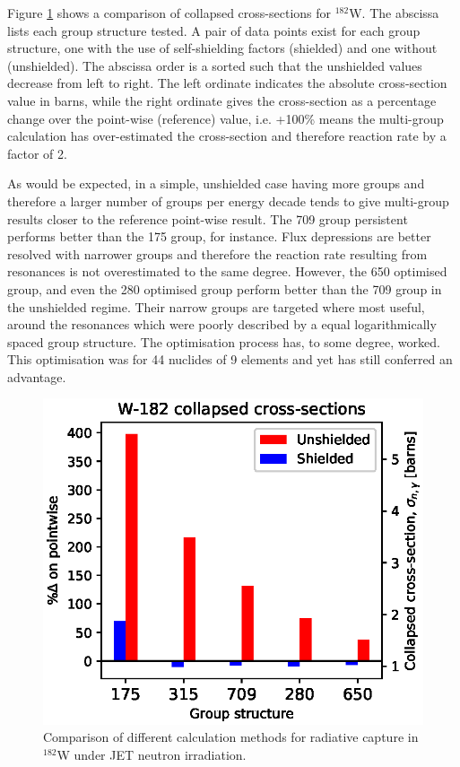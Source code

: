 Figure \ref{fig:tungsten-182} shows a comparison of collapsed cross-sections for $^{182}$W. The abscissa lists each group structure tested. A pair of data points exist for each group structure, one with the use of self-shielding factors (shielded) and one without (unshielded). The abscissa order is a sorted such that the unshielded values decrease from left to right. The left ordinate indicates the absolute cross-section value in barns, while the right ordinate gives the cross-section as a percentage change over the point-wise (reference) value, i.e. +100\% means the multi-group calculation has over-estimated the cross-section and therefore reaction rate by a factor of 2.

As would be expected, in a simple, unshielded case having more groups and therefore a larger number of groups per energy decade tends to give multi-group results closer to the reference point-wise result. The 709 group persistent performs better than the 175 group, for instance. Flux depressions are better resolved with narrower groups and therefore the reaction rate resulting from resonances is not overestimated to the same degree. However, the 650 optimised group, and even the 280 optimised group perform better than the 709 group in the unshielded regime. Their narrow groups are targeted where most useful, around the resonances which were poorly described by a equal logarithmically spaced group structure. The optimisation process has, to some degree, worked. This optimisation was for 44 nuclides of 9 elements and yet has still conferred an advantage.

\begin{figure}[H]
  \centering
  \includegraphics[width=0.8\linewidth]{W-182.eps}
  \caption{Comparison of different calculation methods for radiative capture in $^{182}$W under JET neutron irradiation.}
  \label{fig:tungsten-182}
\end{figure}

